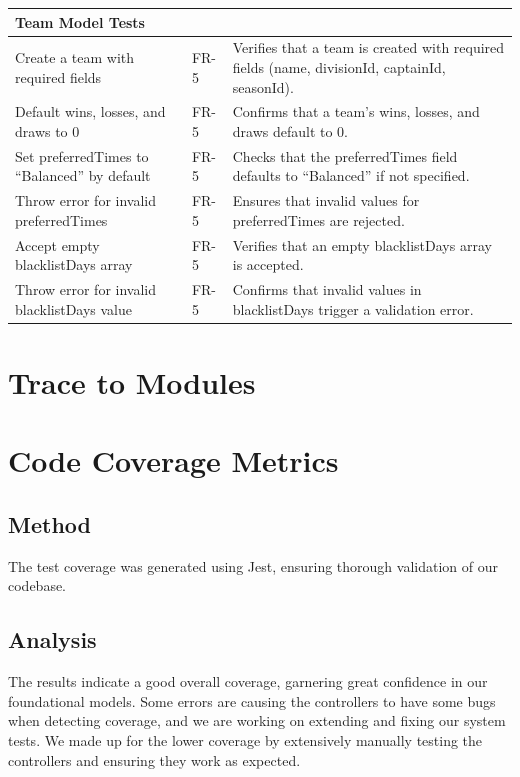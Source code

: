 \documentclass[12pt, titlepage]{article}
\begin{document}
\begin{longtable}{|p{}|p{}|p{}|}
    \textbf{Team Model Tests} & & \\ \hline
    Create a team with required fields & FR-5 & Verifies that a team is created with required fields (name, divisionId, captainId, seasonId). \\ \hline
    Default wins, losses, and draws to 0 & FR-5 & Confirms that a team's wins, losses, and draws default to 0. \\ \hline
    Set preferredTimes to ``Balanced'' by default & FR-5 & Checks that the preferredTimes field defaults to ``Balanced'' if not specified. \\ \hline
    Throw error for invalid preferredTimes & FR-5 & Ensures that invalid values for preferredTimes are rejected. \\ \hline
    Accept empty blacklistDays array & FR-5 & Verifies that an empty blacklistDays array is accepted. \\ \hline
    Throw error for invalid blacklistDays value & FR-5 & Confirms that invalid values in blacklistDays trigger a validation error. \\ \hline
    
\end{longtable}
    
		
\section{Trace to Modules}		

\section{Code Coverage Metrics}

\subsection{Method}

The test coverage was generated using Jest, ensuring thorough validation of our codebase.

\subsection{Analysis}
The results indicate a good overall coverage, garnering great confidence in our foundational models.
Some errors are causing the controllers to have some bugs when detecting coverage, and we are working on extending and fixing our system tests. We made up for the lower coverage by extensively manually testing the controllers and ensuring they work as expected.
\end{document}
